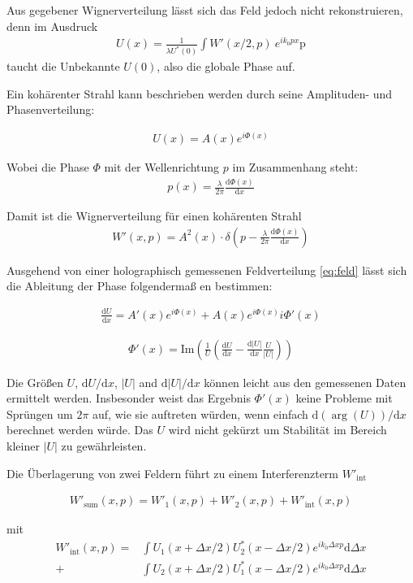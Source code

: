 \documentclass{article}
\newcommand{\trmd}{\textrm{d}}
\begin{document}
Aus gegebener Wignerverteilung l\"asst sich das Feld jedoch nicht
rekonstruieren, denn im Ausdruck
\begin{align}
  U(x) = \frac{1}{\lambda U^*(0)} \int W'(x/2,p)\ e^{ik_0 px} \textrm{p}
\end{align}
taucht die Unbekannte $U(0)$, also die globale Phase auf.

Ein koh\"arenter Strahl kann beschrieben werden durch seine
Amplituden- und Phasenverteilung:

\begin{align}
  \label{eq:feld}
  U(x) = A(x) e^{i\Phi(x)}
\end{align}

Wobei die Phase $\Phi$ mit der Wellenrichtung $p$ im Zusammenhang steht:
\begin{align}
  p(x) = \frac{\lambda}{2\pi} \frac{\textrm{d} \Phi(x)}{\textrm{d} x}
\end{align}

Damit ist die Wignerverteilung f\"ur einen koh\"arenten Strahl
\begin{align}
  W'(x,p)= A^2(x) \cdot \delta\left(p-\frac{\lambda}{2\pi}
    \frac{\textrm{d} \Phi(x)}{\textrm{d} x}\right)
\end{align}

Ausgehend von einer holographisch gemessenen Feldverteilung
\eqref{eq:feld} l\"asst sich die Ableitung der Phase folgenderma\ss
en bestimmen:

\begin{align}
  \frac{\trmd U}{\trmd x} = A'(x) e^{i\Phi(x)} + A(x) e^{i\Phi(x)} i \Phi'(x)
\end{align}

\begin{align}
  \Phi'(x) = \textrm{Im}\left(\frac{1}{U}\left(\frac{\trmd U}{\trmd x} -  \frac{\trmd |U|}{\trmd x} \frac{U}{| U |}\right)\right) 
\end{align}

Die Gr\"o\ss en $U$, $\trmd U / \trmd x$, $|U|$ and $\trmd |U| / \trmd
x$ k\"onnen leicht aus den gemessenen Daten ermittelt
werden. Insbesonder weist das Ergebnis $\Phi'(x)$ keine Probleme mit
Spr\"ungen um $2\pi$ auf, wie sie auftreten w\"urden, wenn einfach
$\trmd(\arg(U))/\trmd x$ berechnet werden w\"urde. Das $U$ wird nicht
gek\"urzt um Stabilit\"at im Bereich kleiner $|U|$ zu gew\"ahrleisten.


Die \"Uberlagerung von zwei Feldern f\"uhrt zu einem Interferenzterm
$W'_\textrm{int}$

\begin{align}
  W'_\textrm{sum}(x,p) = W'_1(x,p) + W'_2(x,p) + W'_\textrm{int} (x,p)
\end{align}

mit 
\begin{align}
  W'_\textrm{int} (x,p) = 
  &\int U_1(x+\Delta x/2)  U^*_2(x-\Delta x/2) e^{i k_0 \Delta x p} \textrm{d} \Delta x \\
  + &\int U_2(x+\Delta x/2)  U^*_1(x-\Delta x/2) e^{i k_0 \Delta x p} \textrm{d} \Delta x
\end{align}
\end{document}
